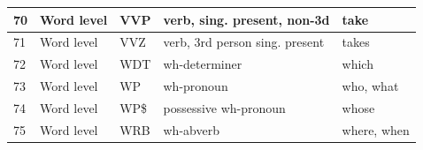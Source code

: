 \begin{longtable}{|p{}|p{}|p{}|p{}|p{}|}
		\rowcolor[HTML]{9AFF99} 
		70                                                        & Word level                                                  & VVP                                                        & verb, sing. present, non-3d                                                                                     & take                                                                            \\ \hline
		\rowcolor[HTML]{9AFF99} 
		71                                                        & Word level                                                  & VVZ                                                        & verb, 3rd person sing. present                                                                                  & takes                                                                           \\ \hline
		\rowcolor[HTML]{9AFF99} 
		72                                                        & Word level                                                  & WDT                                                        & wh-determiner                                                                                                   & which                                                                           \\ \hline
		\rowcolor[HTML]{9AFF99} 
		73                                                        & Word level                                                  & WP                                                         & wh-pronoun                                                                                                      & who, what                                                                       \\ \hline
		\rowcolor[HTML]{9AFF99} 
		74                                                        & Word level                                                  & WP\$                                                       & possessive wh-pronoun                                                                                           & whose                                                                           \\ \hline
		\rowcolor[HTML]{9AFF99} 
		75                                                        & Word level                                                  & WRB                                                        & wh-abverb                                                                                                       & where, when                                                                     \\ \hline
        
       
\end{longtable}


